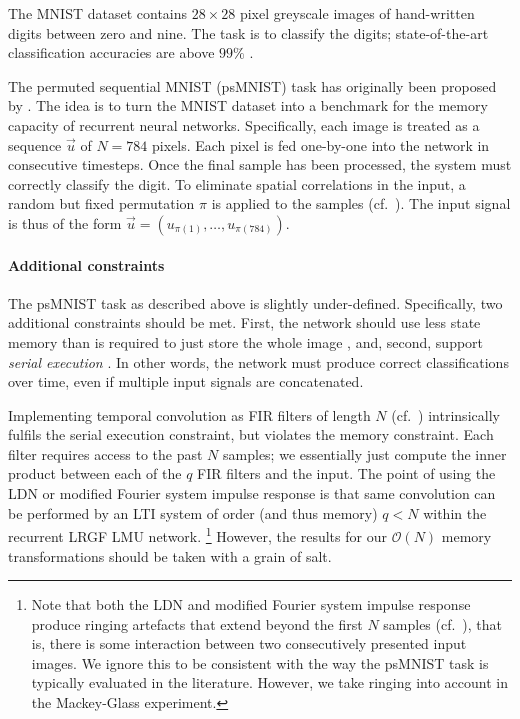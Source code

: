 The MNIST dataset \citep{lecun1998gradientbased} contains $28 \times 28$ pixel greyscale images of hand-written digits between zero and nine.
The task is to classify the digits; state-of-the-art classification accuracies are above $99\%$ \citep{baldominos2019survey}.

The permuted sequential MNIST (psMNIST) task has originally been proposed by \citet{le2015simple}.
The idea is to turn the MNIST dataset into a benchmark for the memory capacity of recurrent neural networks.
Specifically, each image is treated as a sequence $\vec u$ of $N = 784$ pixels.
Each pixel is fed one-by-one into the network in consecutive timesteps.
Once the final sample has been processed, the system must correctly classify the digit.
To eliminate spatial correlations in the input, a random but fixed permutation $\pi$ is applied to the samples (cf.~).
The input signal is thus of the form $\vec u = (u_{\pi(1)}, \ldots, u_{\pi(784)})$.

\paragraph{Additional constraints}
The psMNIST task as described above is slightly under-defined.
Specifically, two additional constraints should be met.
First, the network should use less state memory than is required to just store the whole image \citep{voelker2019lmu}, and, second, support \emph{serial execution} \citep{chandar2019nonsaturating}.
In other words, the network must produce correct classifications over time, even if multiple input signals are concatenated.

Implementing temporal convolution as FIR filters of length $N$ (cf.~) intrinsically fulfils the serial execution constraint, but violates the memory constraint.
Each filter requires access to the past $N$ samples; we essentially just compute the inner product between each of the $q$ FIR filters and the input.
The point of using the LDN or modified Fourier system impulse response is that same convolution can be performed by an LTI system of order (and thus memory) $q < N$ within the recurrent LRGF LMU network.%
\footnote{Note that both the LDN and modified Fourier system impulse response produce ringing artefacts that extend beyond the first $N$ samples (cf.~), that is, there is some interaction between two consecutively presented input images.
We ignore this to be consistent with the way the psMNIST task is typically evaluated in the literature.
However, we take ringing into account in the Mackey-Glass experiment.}
However, the results for our $\mathcal{O}(N)$ memory transformations should be taken with a grain of salt.

